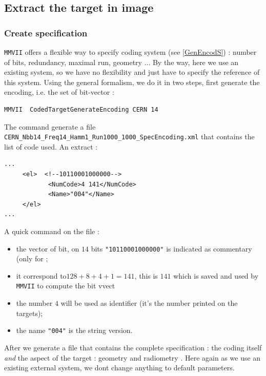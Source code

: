 
\subsection{Extract the target in image}


\subsubsection{Create specification}

{\tt MMVII} offers a flexible way to specify coding system (see \ref{GenEncodS}) :
number of bits, redundancy,  maximal run, geometry ... By the way, here we use
an existing system, so we have no flexibility and just have to specify the reference 
of this system.  Using the general formalism, we do it in two steps, first generate
the encoding, i.e. the set of bit-vector :

\begin{lstlisting}
MMVII  CodedTargetGenerateEncoding CERN 14
\end{lstlisting}

The command generate a file {\tt CERN\_Nbb14\_Freq14\_Hamm1\_Run1000\_1000\_SpecEncoding.xml}
that contains the list of code used. An extract :

\begin{lstlisting}
...
     <el>  <!--10110001000000-->
            <NumCode>4 141</NumCode>
            <Name>"004"</Name>
     </el>
...
\end{lstlisting}

A quick command on the file :

\begin{itemize}
	\item the vector of bit, on $14$ bits  {\tt "10110001000000"} is indicated
		as  commentary (only for ;
        \item it correspond to$128+8+4+1=141$, this is $141$ which is saved
		and used by {\tt MMVII} to compute the bit vvect
	\item  the  number $4$ will be used as identifier  (it's the number printed on the targets);
	\item  the  name {\tt "004"} is the string version.
\end{itemize}

After we generate a file that contains the complete specification : the coding itself
\emph{and} the aspect of the target : geometry and radiometry .  Here again
as we use an existing external system, we dont change anything to default parameters.

